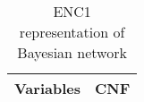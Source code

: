 \begin{table}[H]
\centering
\caption{ENC1 representation of Bayesian network}
\label{cnfRepresentationEnc1}
\begin{tabular}{c|cl}
\hline
Variables & \multicolumn{2}{c}{CNF}                                                                                                                                                                                                                                                                                                                                                                                                                                                                                                                                                                                                                                                                                                                                                                                                                                                                                                                                                                                                                                                                                                                                                                                                                                                                                                                                                                                                                                                                                                                                        \\ \hline

\end{tabular}
\end{table}

